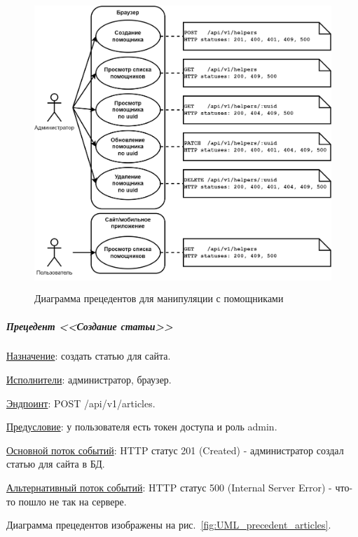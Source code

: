 
\begin{figure}[!p]
    \centering

    \includegraphics[height=11cm]
    {images/UML/UML_precedent_helpres.png}

    \caption{Диаграмма прецедентов для манипуляции с помощниками}

    \label{fig:UML_precedent_helpres}
\end{figure}


\subparagraph{Прецедент <<Создание статьи>>} \hspace{0pt}

\underline{Назначение}: создать статью для сайта.

\underline{Исполнители}: администратор, браузер.

\underline{Эндпоинт}: POST /api/v1/articles.

\underline{Предусловие}: у пользователя есть токен доступа и роль admin.

\underline{Основной поток событий}: HTTP статус 201 (Created) - администратор создал статью для сайта в БД. 

\underline{Альтернативный поток событий}:
HTTP статус 500 (Internal Server Error) - что-то пошло не так на сервере.

Диаграмма прецедентов изображены на рис.~\ref{fig:UML_precedent_articles}.


